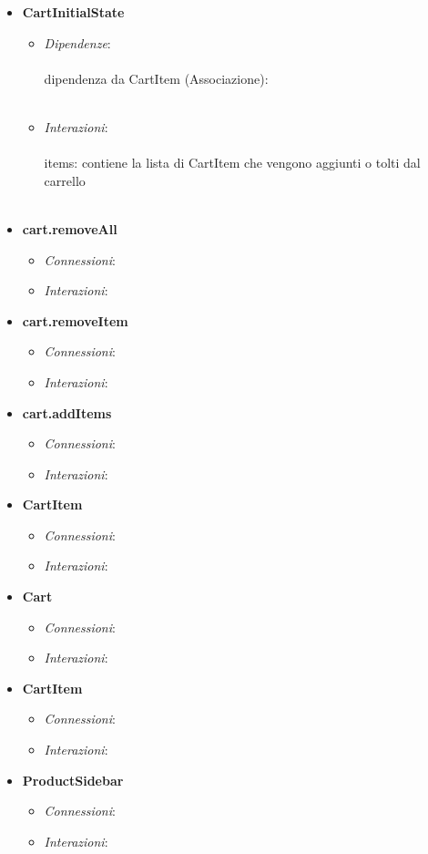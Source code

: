 \begin{itemize}
\begin{itemize}
			\\\\
		\end{itemize}
		\item \textbf{CartInitialState}
		\begin{itemize}
			\item \textit{Dipendenze}: 
			\\\\
			dipendenza da CartItem (Associazione):
			\\\\
			\item \textit{Interazioni}:
			\\\\
			items: contiene la lista di CartItem che vengono aggiunti o tolti dal carrello
			\\\\
		\end{itemize} 
		\item \textbf{cart.removeAll}
		\begin{itemize}
			\item \textit{Connessioni}:
			\item \textit{Interazioni}:
		\end{itemize} 
		\item \textbf{cart.removeItem}
		\begin{itemize}
			\item \textit{Connessioni}:
			\item \textit{Interazioni}:
		\end{itemize} 
		\item \textbf{cart.addItems}
		\begin{itemize}
			\item \textit{Connessioni}:
			\item \textit{Interazioni}:
		\end{itemize} 	
		\item \textbf{CartItem}
		\begin{itemize}
			\item \textit{Connessioni}:
			\item \textit{Interazioni}:
		\end{itemize} 
		\item \textbf{Cart}
		\begin{itemize}
			\item \textit{Connessioni}:
			\item \textit{Interazioni}:
		\end{itemize} 
		\item \textbf{CartItem}
		\begin{itemize}
			\item \textit{Connessioni}:
			\item \textit{Interazioni}:
		\end{itemize} 
		\item \textbf{ProductSidebar}
		\begin{itemize}
			\item \textit{Connessioni}:
			\item \textit{Interazioni}:
		\end{itemize} 
	\end{itemize}
